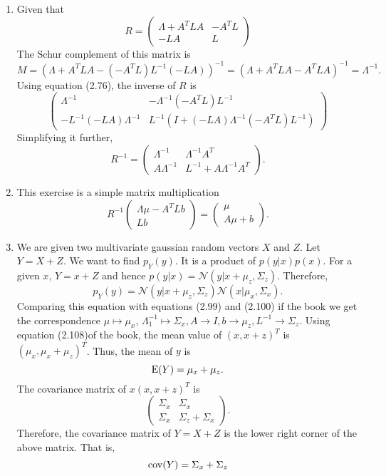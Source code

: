 \begin{enumerate}
\item Given that 
\[
R = \begin{pmatrix} \Lambda + A^T L A & -A^T L \\
-LA & L \end{pmatrix}
\]
The Schur complement of this matrix is 
\[
M = (\Lambda + A^TLA - (-A^TL)L^{-1}(-LA))^{-1} = (\Lambda + A^TLA - A^TLA)^{-1} = \Lambda^{-1}.
\]
Using equation (2.76), the inverse of $R$ is
\[
\begin{pmatrix}
\Lambda^{-1} & -\Lambda^{-1}(-A^TL)L^{-1} \\
-L^{-1}(-LA)\Lambda^{-1} & L^{-1}(I + (-LA)\Lambda^{-1}(-A^TL)L^{-1})\end{pmatrix}
\]
Simplifying it further,
\[
R^{-1} = \begin{pmatrix} \Lambda^{-1} & \Lambda^{-1}A^T \\
A\Lambda^{-1} & L^{-1} + A\Lambda^{-1}A^T\end{pmatrix}.
\]

\item This exercise is a simple matrix multiplication
\[
R^{-1}\begin{pmatrix}\Lambda\mu - A^TLb \\ Lb\end{pmatrix} = \begin{pmatrix}\mu \\ A\mu + b\end{pmatrix}.
\]

\item We are given two multivariate gaussian random vectors $X$ and $Z$. Let $Y = X + Z$. We want to
find $p_Y(y)$. It is a product of $p(y|x)p(x)$. For a given $x$, $Y = x + Z$ and hence $p(y|x) = 
\mathcal{N}(y| x + \mu_z, \Sigma_z)$. Therefore,
\[
p_Y(y) = \mathcal{N}(y | x + \mu_z, \Sigma_z)\mathcal{N}(x | \mu_x, \Sigma_x).
\]
Comparing this equation with equations (2.99) and (2.100) if the book we get the correspondence $\mu \mapsto \mu_x$,
$\Lambda_1^{-1} \mapsto \Sigma_x, A \to I, b \to \mu_z, L^{-1} \to \Sigma_z$. Using equation (2.108)of the
book, the mean value of $(x, x + z)^T$ is $(\mu_x, \mu_x + \mu_z)^T$. Thus, the mean of $y$ is
\[
\operatorname{E}(Y) = \mu_x + \mu_z.
\]
The covariance matrix of $x(x, x + z)^T$ is
\[
\begin{pmatrix}\Sigma_x & \Sigma_x \\ \Sigma_x & \Sigma_z + \Sigma_x\end{pmatrix}.
\]
Therefore, the covariance matrix of $Y = X + Z$ is the lower right corner of the above matrix. That is,
\[
\operatorname{cov}(Y) = \Sigma_x + \Sigma_z
\]


\end{enumerate}
